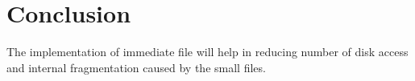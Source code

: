 \chapter{Conclusion}

The implementation of immediate file will help in reducing number of disk access and internal fragmentation caused by the small files. 
